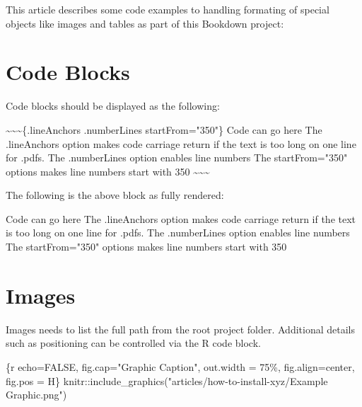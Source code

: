 \documentclass[
]{book}
\newenvironment{Shaded}{\begin{snugshade}}{\end{snugshade}}
\newcommand{\NormalTok}[1]{#1}
\begin{document}
This article describes some code examples to handling formating of special objects like images and tables as part of this Bookdown project:

\hypertarget{code-blocks}{%
\section{Code Blocks}\label{code-blocks}}

Code blocks should be displayed as the following:

\begin{Shaded}
\begin{Highlighting}[]
\NormalTok{\textasciitilde{}\textasciitilde{}\textasciitilde{}\{.lineAnchors .numberLines startFrom="350"\}}
\NormalTok{Code can go here}
\NormalTok{The .lineAnchors option makes code carriage return if the text is too long on one line for .pdfs.}
\NormalTok{The .numberLines option enables line numbers}
\NormalTok{The startFrom="350" options makes line numbers start with 350}
\NormalTok{\textasciitilde{}\textasciitilde{}\textasciitilde{}}
\end{Highlighting}
\end{Shaded}

The following is the above block as fully rendered:

\begin{Shaded}
\begin{Highlighting}[numbers=left,,firstnumber=350,]
\NormalTok{Code can go here}
\NormalTok{The .lineAnchors option makes code carriage return if the text is too long on one line for .pdfs.}
\NormalTok{The .numberLines option enables line numbers}
\NormalTok{The startFrom="350" options makes line numbers start with 350}
\end{Highlighting}
\end{Shaded}

\hypertarget{images}{%
\section{Images}\label{images}}

Images needs to list the full path from the root project folder. Additional details such as positioning can be controlled via the R code block.

\begin{Shaded}
\begin{Highlighting}[]
\NormalTok{\textasciigrave{}\textasciigrave{}\textasciigrave{}\{r echo=FALSE, fig.cap="Graphic Caption", out.width = \textquotesingle{}75\%\textquotesingle{}, fig.align=\textquotesingle{}center\textquotesingle{}, fig.pos = \textquotesingle{}H\textquotesingle{}\}}
\NormalTok{knitr::include\_graphics("articles/how{-}to{-}install{-}xyz/Example Graphic.png")}
\NormalTok{\textasciigrave{}\textasciigrave{}\textasciigrave{}}
\end{Highlighting}
\end{Shaded}
\end{document}
